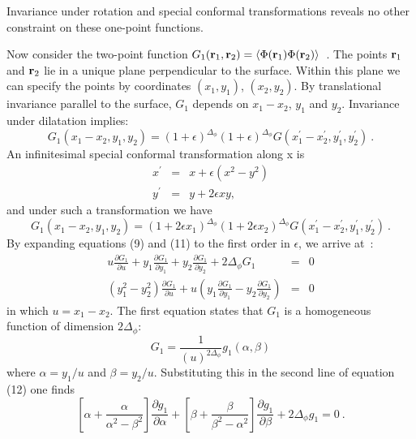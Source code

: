 Invariance under rotation and special conformal transformations reveals no
other constraint on these one-point functions.

Now consider the two-point function $G_{1}({\bf{r}}_{1},{\bf r}_{2})
=\left<\Phi({\bf r}_{1})\Phi({\bf r}_{2})\right>$~.
The points ${\bf r}_{1}$ and ${\bf r}_{2}$ lie in a unique plane perpendicular to the
surface. Within this plane we can specify the points by coordinates $(x_{1},y_{1})$, $(x_{2},y_{2})$.
By translational invariance parallel to the surface, $G_{1}$ depends on $x_{1}-x_{2}$,
$y_{1}$ and $y_{2}$. Invariance under dilatation implies:
\begin{equation}
G_{1}(x_{1}-x_{2},y_{1},y_{2})=(1+\epsilon)^{\Delta_{\phi}}
(1+\epsilon)^{\Delta_{\phi}}G(x_{1}^{\prime}-x_{2}^{\prime}
,y_{1}^{\prime},y_{2}^{\prime})~.
\end{equation}
An infinitesimal special conformal transformation along x is 
\begin{eqnarray}
x^{\prime}&=&x+\epsilon(x^{2}-y^{2})\nonumber\\
y^{\prime}&=&y+2\epsilon xy,
\end{eqnarray}
and under such a transformation we have 
\begin{equation}
G_{1}(x_{1}-x_{2},y_{1},y_{2})=
(1+2\epsilon x_{1})^{\Delta_{\phi}}(1+2\epsilon x_{2})^{\Delta_{\phi}}G(x_{1}^{\prime}-x_{2}^{\prime},y_{1}^{\prime},y_{2}^{\prime})~.
\end{equation}
By expanding equations (9) and (11) to the first order in $\epsilon$, we arrive at~:
\begin{eqnarray}
u \frac {\partial{G_{1}}}{\partial{u}}
+ y_{1} \frac{\partial{G_{1}}}{\partial{y_{1}}}
+ y_{2} \frac{\partial{G_{1}}}{\partial{y_{2}}}
+ 2{\Delta}_{\phi}G_{1}&=&0\nonumber\\
({y_{1}^{2}}-{y_{2}^{2}})
\frac {\partial{G_{1}}}{\partial{u}} +
u\left(y_{1} \frac{\partial{G_{1}}}{\partial{y_{1}}}
- {y_{2}} \frac {\partial{G_{1}}}{\partial{y_{2}}}\right)&=&0
\end{eqnarray}
in which $u=x_{1}-x_{2}$. The first equation states that $G_{1}$ is a homogeneous
function of dimension $2\Delta_{\phi}$:
\begin{equation}
G_{1}=\frac {1}{(u)^{2\Delta_{\phi}}}g_{1}(\alpha,\beta)
\end{equation}
where $\alpha={y_{1}}/{u}$ and $\beta={y_{2}}/{u}$. Substituting
this in the second line of equation (12) one finds \cite{Cardy}
\begin{equation}
\left[\alpha + \frac {\alpha}{\alpha^{2}-\beta^{2}}\right]\frac {\partial{g_{1}}}{\partial{\alpha}}+\left[\beta + \frac {\beta}{\beta^{2}-\alpha^{2}}\right]
\frac {\partial{g_{1}}}{\partial{\beta}}+2\Delta_{\phi}g_{1}=0~.
\end{equation}
